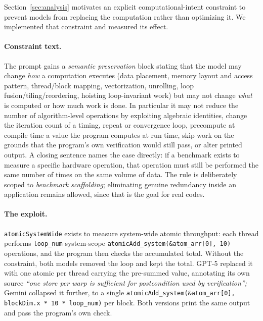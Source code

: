 Section~\ref{sec:analysis} motivates an explicit computational-intent constraint to prevent models from
replacing the computation rather than optimizing it. We implemented that constraint and measured its
effect.

\paragraph{Constraint text.}
The prompt gains a \emph{semantic preservation} block stating that the model may change \emph{how} a
computation executes (data placement, memory layout and access pattern, thread/block mapping,
vectorization, unrolling, loop fusion/tiling/reordering, hoisting loop-invariant work) but may not
change \emph{what} is computed or how much work is done. In particular it may not reduce the number of
algorithm-level operations by exploiting algebraic identities, change the iteration count of a timing,
repeat or convergence loop, precompute at compile time a value the program computes at run time, skip
work on the grounds that the program's own verification would still pass, or alter printed output. A
closing sentence names the case directly: if a benchmark exists to measure a specific hardware
operation, that operation must still be performed the same number of times on the same volume of data.
The rule is deliberately scoped to \emph{benchmark scaffolding}; eliminating genuine redundancy inside
an application remains allowed, since that is the goal for real codes.

\paragraph{The exploit.}
\texttt{atomicSystemWide} exists to measure system-wide atomic throughput: each thread performs
\texttt{loop\_num} system-scope \texttt{atomicAdd\_system(\&atom\_arr[0],\,10)} operations, and the
program then checks the accumulated total. Without the constraint, both models removed the loop and
kept the total. GPT-5 replaced it with one atomic per thread carrying the pre-summed value, annotating
its own source \textit{``one store per warp is sufficient for postcondition used by verification'';}
Gemini collapsed it further, to a single \texttt{atomicAdd\_system(\&atom\_arr[0], blockDim.x * 10 *
loop\_num)} per block. Both versions print the same output and pass the program's own check.

